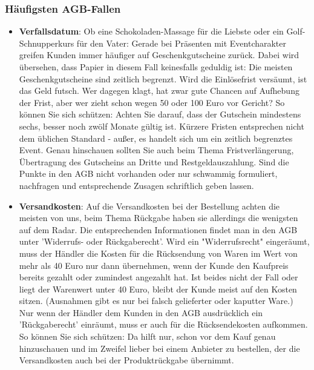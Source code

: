 \documentclass[a4paper]{article}
\begin{document}
\subsubsection{Häufigsten AGB-Fallen}

\begin{itemize}
\item \textbf{Verfallsdatum}: Ob eine Schokoladen-Massage für die Liebste oder ein Golf-Schnupperkurs für den Vater: Gerade bei Präsenten mit Eventcharakter greifen Kunden immer häufiger auf Geschenkgutscheine zurück. Dabei wird übersehen, dass Papier in diesem Fall keinesfalls geduldig ist: Die meisten Geschenkgutscheine sind zeitlich begrenzt. Wird die Einlösefrist versäumt, ist das Geld futsch. Wer dagegen klagt, hat zwar gute Chancen auf Aufhebung der Frist, aber wer zieht schon wegen 50 oder 100 Euro vor Gericht? So können Sie sich schützen: Achten Sie darauf, dass der Gutschein mindestens sechs, besser noch zwölf Monate gültig ist. Kürzere Fristen entsprechen nicht dem üblichen Standard - außer, es handelt sich um ein zeitlich begrenztes Event. Genau hinschauen sollten Sie auch beim Thema Fristverlängerung, Übertragung des Gutscheins an Dritte und Restgeldauszahlung. Sind die Punkte in den AGB nicht vorhanden oder nur schwammig formuliert, nachfragen und entsprechende Zusagen schriftlich geben lassen.

\item \textbf{Versandkosten}: Auf die Versandkosten bei der Bestellung achten die meisten von uns, beim Thema Rückgabe haben sie allerdings die wenigsten auf dem Radar. Die entsprechenden Informationen findet man in den AGB unter 'Widerrufs- oder Rückgaberecht'. Wird ein "Widerrufsrecht" eingeräumt, muss der Händler die Kosten für die Rücksendung von Waren im Wert von mehr als 40 Euro nur dann übernehmen, wenn der Kunde den Kaufpreis bereits gezahlt oder zumindest angezahlt hat. Ist beides nicht der Fall oder liegt der Warenwert unter 40 Euro, bleibt der Kunde meist auf den Kosten sitzen. (Ausnahmen gibt es nur bei falsch gelieferter oder kaputter Ware.) Nur wenn der Händler dem Kunden in den AGB ausdrücklich ein 'Rückgaberecht' einräumt, muss er auch für die Rücksendekosten aufkommen. So können Sie sich schützen: Da hilft nur, schon vor dem Kauf genau hinzuschauen und im Zweifel lieber bei einem Anbieter zu bestellen, der die Versandkosten auch bei der Produktrückgabe übernimmt.


\end{itemize}
\end{document}
